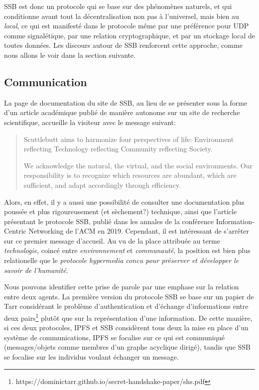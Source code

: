 \documentclass{article}
\begin{document}
SSB est donc un protocole qui se base sur des phénomènes naturels, et qui conditionne avant tout la décentralisation non pas à l'universel, mais bien au \emph{local}, ce qui est manifesté dans le protocole même par une préférence pour UDP comme signalétique, par une relation cryptographique, et par un stockage local de toutes données. Les discours autour de SSB renforcent cette approche, comme nous allons le voir dans la section suivante.

\subsection{Communication}

La page de documentation du site de SSB, au lieu de se présenter sous la forme d'un article académique publié de manière autonome sur un site de recherche scientifique, accueille la visiteur avec le message suivant:

\begin{quote}
    Scuttlebutt aims to harmonize four perspectives of life: Environment reflecting Technology reflecting Community reflecting Society.

    We acknowledge the natural, the virtual, and the social environments. Our responsibility is to recognize which resources are abundant, which are sufficient, and adapt accordingly through efficiency.
\end{quote}

Alors, en effet, il y a aussi une possibilité de consulter une documentation plus poussée et plus rigoureusement (et sèchement?) technique, ainsi que l'article présentant le protocole SSB, publié dans les annales de la conférence Information-Centric Networking de l'ACM en 2019. Cependant, il est intéressant de s'arrêter sur ce premier message d'accueil. Au vu de la place attribuée au terme \emph{technologie}, coincé entre \emph{environnement} et \emph{communauté}, la position est bien plus relationelle que le \emph{protocole hypermedia concu pour préserver et développer le savoir de l'humanité}.

Nous pouvons identifier cette prise de parole par une emphase sur la relation entre deux agents. La premìère version du protocole SSB se base sur un papier de Tarr considérant le problème d'authentication et d'échange d'informations entre deux pairs\footnote{https://dominictarr.github.io/secret-handshake-paper/shs.pdf} plutôt que sur la représentation d'une information. De cette manière, si ces deux protocoles, IPFS et SSB considèrent tous deux la mise en place d'un système de communications, IPFS se focalise sur ce qui est communiqué (messages/objets comme membres d'un graphe acyclique dirigé), tandis que SSB se focalise sur les individus voulant échanger un message.
\end{document}

